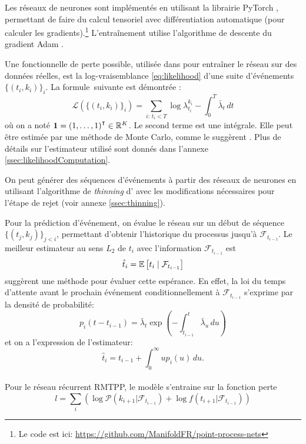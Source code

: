 \documentclass[../main.tex]{subfiles}
\begin{document}
	
Les réseaux de neurones sont implémentés en utilisant la librairie \textsf{PyTorch} \cite{paszke2017automatic}, permettant de faire du calcul tensoriel avec différentiation automatique (pour calculer les gradients).\footnote{Le code est ici: \url{https://github.com/ManifoldFR/point-process-nets}} L'entraînement utilise l'algorithme de descente du gradient Adam \autocite{AdamKingmaB14}.

Une fonctionnelle de perte possible, utilisée dans \autocite{meiEisnerNeuralHawkes} pour entraîner le réseau sur des données réelles, est la log-vraisemblance \eqref{eq:likelihood} d'une suite d'événements $\{(t_i,k_i)\}_i$. La formule\footnotemark~suivante est démontrée \cite[15]{meiEisnerNeuralHawkes}: 
\begin{equation}\label{eq:explicitLikelihood}
\mathcal{L}\left(\{(t_i,k_i)\}_i\right)
=
\sum_{i:\, t_i < T} \log\lambda^{k_i}_{t_i} - \int_0^T \bar\lambda_t\,dt
\end{equation}
où on a noté $\mathbf{1} = {(1,\ldots,1)}^\intercal\in\mathbb{R}^K$. Le second terme est une intégrale. Elle peut être estimée par une méthode de Monte Carlo, comme le suggèrent \citeauthor{meiEisnerNeuralHawkes}. Plus de détails sur l'estimateur utilisé sont donnés dans l'annexe \ref{ssec:likelihoodComputation}.


On peut générer des séquences d'événements à partir des réseaux de neurones en utilisant l'algorithme de \textit{thinning} d'\citeauthor{ogata1981} \autocite{ogata1981} avec les modifications nécessaires pour l'étape de rejet (voir annexe \ref{ssec:thinning}).

Pour la prédiction d'événement, on évalue le réseau sur un début de séquence $\{(t_j,k_j)\}_{j < i}$, permettant d'obtenir l'historique du processus jusqu'à $\mathcal{F}_{t_{i-1}}$. Le meilleur estimateur au sens $L_2$ de $t_i$ avec l'information $\mathcal{F}_{t_{i-1}}$ est
\[
	\hat{t}_i = \mathbb{E}\left[ t_i \mid \mathcal{F}_{t_{i-1}} \right]
\]
\citeauthor{meiEisnerNeuralHawkes} suggèrent une méthode pour évaluer cette espérance. En effet, la loi du temps d'attente avant le prochain événement conditionnellement à $\mathcal{F}_{t_{i-1}}$ s'exprime par la densité de probabilité:
\begin{equation}\label{eq:nextIncrementDensity}
	p_i(t-t_{i-1}) = \bar\lambda_t\exp\left(-\int_{t_{i-1}}^t\bar\lambda_u\,du\right)
\end{equation}
et on a l'expression de l'estimateur:
\begin{equation}\label{eq:nextEventTimeEstimator}
	\hat{t}_i = t_{i-1} + \int_0^\infty u p_i(u)\,du.
\end{equation}

\paragraph{}
Pour le réseau récurrent RMTPP, le modèle s'entraine sur la fonction perte
\begin{equation}
l =  \sum_i(\log\mathcal{P}(k_{i+1} | \mathcal{F}_{t_{i-1}}) + \log f(t_{i+1}|  \mathcal{F}_{t_{i-1}}   )  )
\end{equation}
\end{document}
